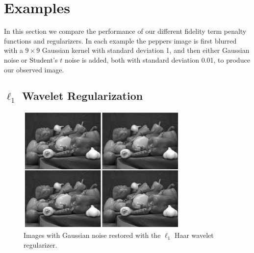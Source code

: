 \documentclass[10pt,a4paper]{article}
\begin{document}
	\section{Examples}
	
	In this section we compare the performance of our different fidelity term penalty functions and regularizers. In each example the peppers image is first blurred with a $9 \times 9$ Gaussian kernel with standard deviation 1, and then either Gaussian noise or Student's $t$ noise is added, both with standard deviation 0.01, to produce our observed image. 
	
	\subsection{$\ell_1$ Wavelet Regularization}
	
	\begin{figure}[H]
		\begin{center}
			\includegraphics[width = 0.75\textwidth]{../figures/waveletGaussH.pdf} 
		\end{center}
		\caption{Images with Gaussian noise restored with the $\ell_1$ Haar wavelet regularizer.}
		\label{waveletH_gauss}
	\end{figure}
	
\end{document}
